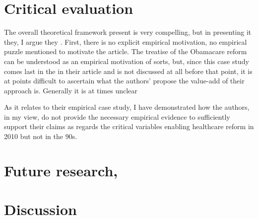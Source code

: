 \documentclass[11pt]{article}
\begin{document}
\section*{Critical evaluation}

The overall theoretical framework \textcite[][]{Jacobs2014} present is very compelling, but in presenting it they, I argue they  . First, there is no explicit empirical motivation, no empirical puzzle mentioned to motivate the article. The treatise of the Obamacare reform can be understood as an empirical motivation of sorts, but, since this case study comes last in the in their article and is not discussed at all before that point, it is at points difficult to ascertain what the authors' propose the value-add of their approach is. Generally it is at times unclear

As it relates to their empirical case study, I have demonstrated how the authors, in my view, do not provide the necessary empirical evidence to sufficiently support their claims as regards the critical variables enabling healthcare reform in 2010 but not in the 90s.

\section*{Future research, }

\section*{Discussion}

\newpage
\newpage
\thispagestyle{empty}
\begingroup
{}
\printbibliography
\endgroup
\end{document}
